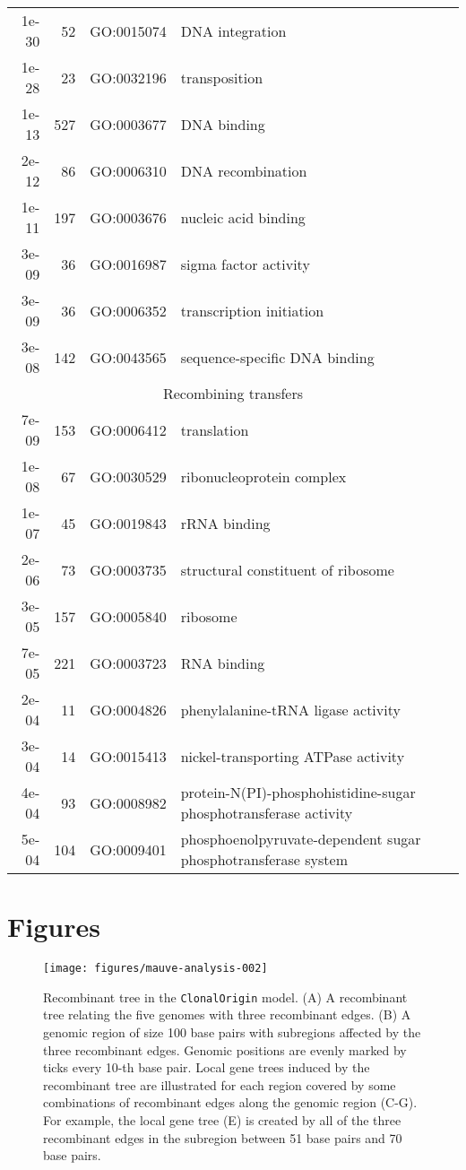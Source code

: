 \documentclass[english]{article}
\begin{document}
\begin{table}
\begin{tabular}{rrll}
1e-30 &  52 & GO:0015074 & DNA integration\\
1e-28 &  23 & GO:0032196 & transposition\\
1e-13 & 527 & GO:0003677 & DNA binding\\
2e-12 &  86 & GO:0006310 & DNA recombination\\
1e-11 & 197 & GO:0003676 & nucleic acid binding\\
3e-09 &  36 & GO:0016987 & sigma factor activity\\
3e-09 &  36 & GO:0006352 & transcription initiation\\
3e-08 & 142 & GO:0043565 & sequence-specific DNA binding\\
\hline
\hline
\multicolumn{4}{c}{Recombining transfers} \\
\hline
7e-09 & 153 & GO:0006412 & translation\\
1e-08 &  67 & GO:0030529 & ribonucleoprotein complex\\
1e-07 &  45 & GO:0019843 & rRNA binding\\
2e-06 &  73 & GO:0003735 & structural constituent of ribosome\\
3e-05 & 157 & GO:0005840 & ribosome\\
7e-05 & 221 & GO:0003723 & RNA binding\\
2e-04 &  11 & GO:0004826 & phenylalanine-tRNA ligase activity\\
3e-04 &  14 & GO:0015413 & nickel-transporting ATPase activity\\
4e-04 &  93 & GO:0008982 & protein-N(PI)-phosphohistidine-sugar phosphotransferase activity\\
5e-04 & 104 & GO:0009401 & phosphoenolpyruvate-dependent sugar phosphotransferase system\\
\end{tabular}

\end{table}



\clearpage{}


\section*{Figures\clearpage{}}

\begin{figure}
\texttt{[image: figures/mauve-analysis-002]}
\caption{\label{fig:clonalorigin}Recombinant tree in the \texttt{ClonalOrigin} model.
(A) A recombinant tree relating the five genomes with three recombinant edges.
(B) A genomic region of size 100 base pairs with subregions affected by the
three recombinant edges. Genomic positions are evenly marked by ticks every 
10-th base pair. Local gene trees induced by the recombinant tree are
illustrated for each region covered by some combinations of recombinant edges
along the genomic region (C-G). For example, the local gene tree (E) is created
by all of the three recombinant edges in the subregion between 51 base pairs
and 70 base pairs.}
\end{figure}
\clearpage{}
\end{document}
